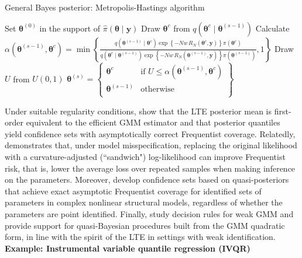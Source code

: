 \begin{algorithm}[h!]
	\caption{General Bayes posterior: Metropolis-Hastings algorithm}\label{Alg:GibbsPosteior}
	\begin{algorithmic}[1]
		\State Set $\bm{\theta}^{(0)}$ in the support of $\hat{\pi}(\bm{\theta}\mid \bm{y})$  		 			
		\State Draw $\bm{\theta}^{c}$ from $q(\bm{\theta}^{c}\mid \bm{\theta}^{(s-1)})$
		\State Calculate $\alpha(\bm{\theta}^{(s-1)}, \bm{\theta}^{c}) = 
		\min\left\{\frac{q(\bm{\theta}^{(s-1)} \mid  \bm{\theta}^{c}) \exp\left\{-Nw\,R_N(\boldsymbol{\theta}^c,\mathbf{y})\right\}\pi(\boldsymbol{\theta}^c)}{q(\bm{\theta}^{c} \mid  \bm{\theta}^{(s-1)}) \exp\left\{-Nw\,R_N(\boldsymbol{\theta}^{(s-1)},\mathbf{y})\right\}\pi(\boldsymbol{\theta}^{(s-1)})}, 1\right\}$
		\State Draw $U$ from $U(0,1)$
		\State $\bm{\theta}^{(s)}=\begin{Bmatrix}
			\bm{\theta}^{c} & \text{if } U\leq \alpha(\bm{\theta}^{(s-1)}, \bm{\theta}^{c})\\
			\bm{\theta}^{(s-1)} & \text{otherwise}\\
		\end{Bmatrix}$
		\EndFor 
	\end{algorithmic} 
\end{algorithm}


Under suitable regularity conditions, \cite{chernozhukov2003mcmc} show that the LTE posterior mean is first-order equivalent to the efficient GMM estimator and that posterior quantiles yield confidence sets with asymptotically correct Frequentist coverage. Relatedly, \cite{Muller2013SandwichBayes} demonstrates that, under model misspecification, replacing the original likelihood with a curvature-adjusted (``sandwich") log-likelihood can improve Frequentist risk, that is, lower the average loss over repeated samples when making inference on the parameters. Moreover, \cite{ChenChristensenTamer2018} develop confidence sets based on quasi-posteriors that achieve exact asymptotic Frequentist coverage for identified sets of parameters in complex nonlinear structural models, regardless of whether the parameters are point identified. Finally, \cite{andrews2022weakgmm} study decision rules for weak GMM and provide support for quasi-Bayesian procedures built from the GMM quadratic form, in line with the spirit of the LTE in settings with weak identification.\\

\textbf{Example: Instrumental variable quantile regression (IVQR)}


